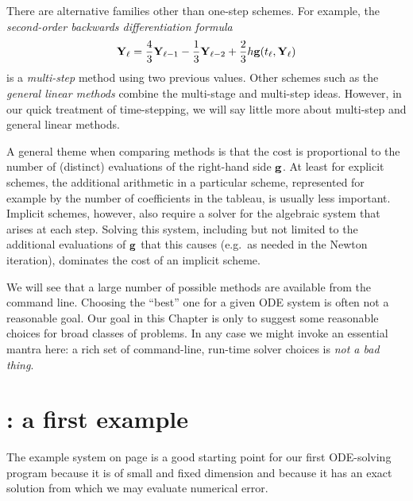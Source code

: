 There are alternative families other than one-step schemes.  For example, the \emph{second-order backwards differentiation formula}
\begin{equation}
\mathbf{Y}_\ell = \frac{4}{3} \mathbf{Y}_{\ell-1} - \frac{1}{3} \mathbf{Y}_{\ell-2} + \frac{2}{3} h \mathbf{g}(t_\ell,\mathbf{Y}_{\ell}) \label{eq:ts:bdf2}
\end{equation}
is a \emph{multi-step} method using two previous values.  Other schemes such as the \emph{general linear methods} \citep{Butcher2008} combine the multi-stage and multi-step ideas.  However, in our quick treatment of time-stepping, we will say little more about multi-step and general linear methods.

A general theme when comparing methods is that the cost is proportional to the number of (distinct) evaluations of the right-hand side $\mathbf{g}$.  At least for explicit schemes, the additional arithmetic in a particular scheme, represented for example by the number of coefficients in the tableau, is usually less important.  Implicit schemes, however, also require a solver for the algebraic system that arises at each step.  Solving this system, including but not limited to the additional evaluations of $\mathbf{g}$ that this causes (e.g.~as needed in the Newton iteration), dominates the cost of an implicit scheme.

We will see that a large number of possible methods are available from the \PETSc command line.  Choosing the ``best'' one for a given ODE system is often not a reasonable goal.  Our goal in this Chapter is only to suggest some reasonable choices for broad classes of problems.  In any case we might invoke an essential \PETSc mantra here: a rich set of command-line, run-time solver choices is \emph{not a bad thing}.


\section{\PETSc \pTS: a first example}

The example system on page \pageref{ex:ts:odeeasy} is a good starting point for our first ODE-solving program because it is of small and fixed dimension and because it has an exact solution from which we may evaluate numerical error.

